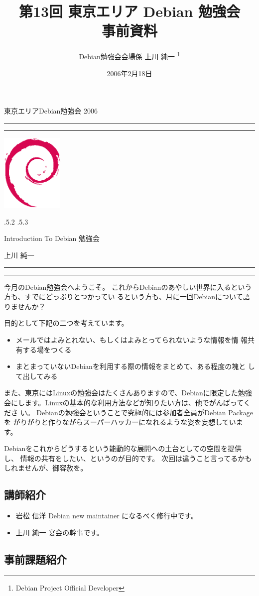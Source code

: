 \documentclass[mingoth,a4paper]{jsarticle}
\makeatletter
\renewcommand{\section}{\@startsection{section}{1}{\z@}%
    {\Cvs \@plus.5\Cdp \@minus.2\Cdp}%
    {.5\Cvs \@plus.3\Cdp}%
    {\normalfont\Large\headfont\raggedright\centering}} %
\newcommand{\dancersection}[2]{%
\newpage
東京エリアDebian勉強会 2006
\hrule
\vspace{0.5mm}
\hrule
\hfill{}\includegraphics[width=3cm]{image200502/openlogo-nd.eps}\\
\vspace{-4cm}
\begin{center}
  \section{#1}
\end{center}
\hfill{}#2\hspace{3cm}\space\\
\hrule
\hrule
\vspace{1cm}
}
\makeatother
\begin{document}
\begin{titlepage}

\title{
 第13回 東京エリア Debian 勉強会 \\事前資料}
\date{2006年2月18日}
\author{Debian勉強会会場係 上川 純一 \thanks{Debian Project Official Developer}} 
\maketitle
\thispagestyle{empty}
\end{titlepage}

\newpage
\tableofcontents

\dancersection{Introduction To Debian 勉強会}{上川 純一}

今月のDebian勉強会へようこそ。
これからDebianのあやしい世界に入るという方も、すでにどっぷりとつかってい
るという方も、月に一回Debianについて語りませんか？

目的として下記の二つを考えています。

\begin{itemize}
 \item メールではよみとれない、もしくはよみとってられないような情報を情
       報共有する場をつくる
 \item まとまっていないDebianを利用する際の情報をまとめて、ある程度の塊と
       して出してみる
\end{itemize}

また、東京にはLinuxの勉強会はたくさんありますので、Debianに限定した勉強
会にします。Linuxの基本的な利用方法などが知りたい方は、他でがんばってくださ
い。
Debianの勉強会ということで究極的には参加者全員がDebian Packageを
がりがりと作りながらスーパーハッカーになれるような姿を妄想しています。

Debianをこれからどうするという能動的な展開への土台としての空間を提供し、
情報の共有をしたい、というのが目的です。
次回は違うこと言ってるかもしれませんが、御容赦を。

\subsection{講師紹介}

\begin{itemize}
 \item{岩松 信洋} Debian new maintainer になるべく修行中です。
 \item{上川 純一} 宴会の幹事です。
\end{itemize}

\subsection{事前課題紹介}
\end{document}
